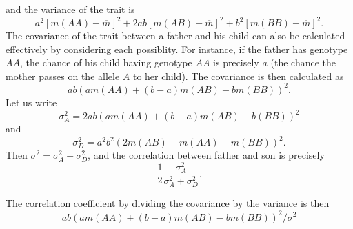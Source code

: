  
%
and the variance of the trait is
%
\[ a^2 [m(AA) - \overline{m}]^2 + 2ab [m(AB) - \overline{m}]^2 + b^2 [m(BB) - \overline{m}]^2. \]
%
The covariance of the trait between a father and his child can also be calculated effectively by considering each possiblity. For instance, if the father has genotype $AA$, the chance of his child having genotype $AA$ is precisely $a$ (the chance the mother passes on the allele $A$ to her child). The covariance is then calculated as
%
\[ ab(a m(AA) + (b - a) m(AB) - b m(BB) )^2. \]
%
Let us write
%
\[ \sigma_A^2 = 2ab ( a m(AA) + (b - a) m(AB) - b (BB) )^2 \]
%
and
%
\[ \sigma_D^2 = a^2 b^2 ( 2 m(AB) - m(AA) - m(BB) )^2. \]
%
Then $\sigma^2 = \sigma_A^2 + \sigma_D^2$, and the correlation between father and son is precisely
%
\[ \frac{1}{2} \frac{\sigma_A^2}{\sigma_A^2 + \sigma_D^2}. \]

The correlation coefficient by dividing the covariance by the variance is then
%
\[ ab ( a m(AA) + (b - a) m(AB) - b m(BB) )^2 / \sigma^2 \]

